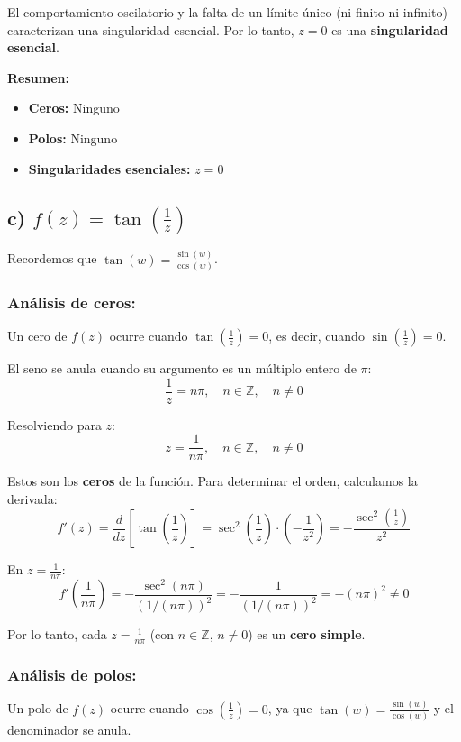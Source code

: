 \documentclass{article}
\begin{document}
El comportamiento oscilatorio y la falta de un límite único (ni finito ni infinito) caracterizan una singularidad esencial. Por lo tanto, $z = 0$ es una \textbf{singularidad esencial}.

\textbf{Resumen:}
\begin{itemize}
\item \textbf{Ceros:} Ninguno
\item \textbf{Polos:} Ninguno
\item \textbf{Singularidades esenciales:} $z = 0$
\end{itemize}

\subsection*{c) $f(z) = \tan\left(\frac{1}{z}\right)$}

Recordemos que $\tan(w) = \frac{\sin(w)}{\cos(w)}$.

\subsubsection*{Análisis de ceros:}

Un cero de $f(z)$ ocurre cuando $\tan\left(\frac{1}{z}\right) = 0$, es decir, cuando $\sin\left(\frac{1}{z}\right) = 0$.

El seno se anula cuando su argumento es un múltiplo entero de $\pi$:
$$\frac{1}{z} = n\pi, \quad n \in \mathbb{Z}, \quad n \neq 0$$

Resolviendo para $z$:
$$z = \frac{1}{n\pi}, \quad n \in \mathbb{Z}, \quad n \neq 0$$

Estos son los \textbf{ceros} de la función. Para determinar el orden, calculamos la derivada:
$$f'(z) = \frac{d}{dz}\left[\tan\left(\frac{1}{z}\right)\right] = \sec^2\left(\frac{1}{z}\right) \cdot \left(-\frac{1}{z^2}\right) = -\frac{\sec^2\left(\frac{1}{z}\right)}{z^2}$$

En $z = \frac{1}{n\pi}$:
$$f'\left(\frac{1}{n\pi}\right) = -\frac{\sec^2(n\pi)}{(1/(n\pi))^2} = -\frac{1}{(1/(n\pi))^2} = -(n\pi)^2 \neq 0$$

Por lo tanto, cada $z = \frac{1}{n\pi}$ (con $n \in \mathbb{Z}$, $n \neq 0$) es un \textbf{cero simple}.

\subsubsection*{Análisis de polos:}

Un polo de $f(z)$ ocurre cuando $\cos\left(\frac{1}{z}\right) = 0$, ya que $\tan(w) = \frac{\sin(w)}{\cos(w)}$ y el denominador se anula.
\end{document}
